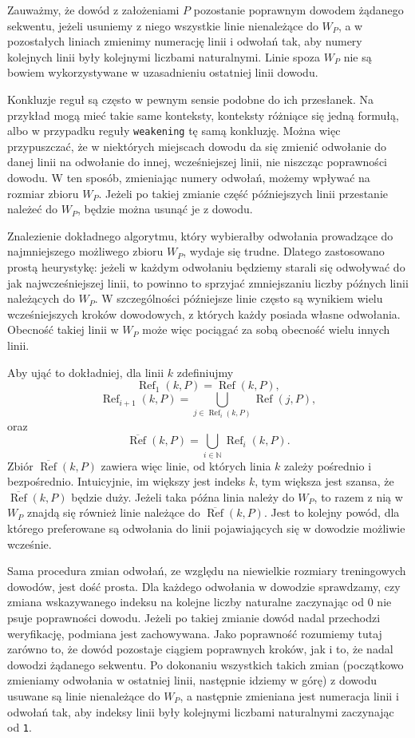 \documentclass[shortabstract]{iithesis}
\theoremstyle{definition}
\theoremstyle{remark}
\theoremstyle{plain}
\begin{document}
Zauważmy, że dowód z założeniami \(P\) pozostanie poprawnym dowodem żądanego
sekwentu, jeżeli usuniemy z niego wszystkie linie nienależące do \(W_P\), a w
pozostałych liniach zmienimy numerację linii i odwołań tak, aby numery kolejnych
linii były kolejnymi liczbami naturalnymi. Linie spoza \(W_P\) nie są bowiem
wykorzystywane w uzasadnieniu ostatniej linii dowodu.

Konkluzje reguł są często w pewnym sensie podobne do ich przesłanek. Na przykład
mogą mieć takie same konteksty, konteksty różniące się jedną formułą, albo w
przypadku reguły \texttt{weakening} tę samą konkluzję. Można więc przypuszczać,
że w niektórych miejscach dowodu da się zmienić odwołanie do danej linii na
odwołanie do innej, wcześniejszej linii, nie niszcząc poprawności dowodu. W ten
sposób, zmieniając numery odwołań, możemy wpływać na rozmiar zbioru \(W_P\). Jeżeli
po takiej zmianie część późniejszych linii przestanie należeć do \(W_P\), będzie
można usunąć je z dowodu.

Znalezienie dokładnego algorytmu, który wybierałby odwołania prowadzące do
najmniejszego możliwego zbioru \(W_P\), wydaje się trudne. Dlatego zastosowano
prostą heurystykę: jeżeli w każdym odwołaniu będziemy starali się odwoływać do
jak najwcześniejszej linii, to powinno to sprzyjać zmniejszaniu liczby późnych
linii należących do \(W_P\). W szczególności późniejsze linie często są wynikiem
wielu wcześniejszych kroków dowodowych, z których każdy posiada własne odwołania.
Obecność takiej linii w \(W_P\) może więc pociągać za sobą obecność wielu innych
linii.

Aby ująć to dokładniej, dla linii \(k\) zdefiniujmy
\[
\operatorname{Ref}_1(k,P) = \operatorname{Ref}(k,P),
\]
\[
\operatorname{Ref}_{i+1}(k,P)
=
\bigcup_{j \in \operatorname{Ref}_i(k,P)} \operatorname{Ref}(j,P),
\]
oraz
\[
\overline{\operatorname{Ref}}(k,P)
=
\bigcup_{i \in \mathbb{N}} \operatorname{Ref}_{i}(k,P).
\]
Zbiór \(\overline{\operatorname{Ref}}(k,P)\) zawiera więc linie, od których linia
\(k\) zależy pośrednio i bezpośrednio. Intuicyjnie, im większy jest indeks \(k\), tym większa
jest szansa, że \(\overline{\operatorname{Ref}}(k,P)\) będzie duży. Jeżeli taka
późna linia należy do \(W_P\), to razem z nią w \(W_P\) znajdą się również linie
należące do \(\overline{\operatorname{Ref}}(k,P)\). Jest to kolejny powód, dla
którego preferowane są odwołania do linii pojawiających się w dowodzie możliwie
wcześnie.

Sama procedura zmian odwołań, ze względu na niewielkie rozmiary treningowych
dowodów, jest dość prosta. Dla każdego odwołania w dowodzie sprawdzamy, czy
zmiana wskazywanego indeksu na kolejne liczby naturalne zaczynając od \(0\) nie psuje
poprawności dowodu. Jeżeli po takiej zmianie dowód nadal przechodzi weryfikację,
podmiana jest zachowywana. Jako poprawność rozumiemy tutaj zarówno to, że dowód
pozostaje ciągiem poprawnych kroków, jak i to, że nadal dowodzi żądanego sekwentu.
Po dokonaniu wszystkich takich zmian (początkowo zmieniamy odwołania w ostatniej linii, 
następnie idziemy w górę) z dowodu usuwane są linie nienależące do \(W_P\), a
następnie zmieniana jest numeracja linii i odwołań tak, aby indeksy linii były
kolejnymi liczbami naturalnymi zaczynając od \texttt{1}. 
\end{document}
